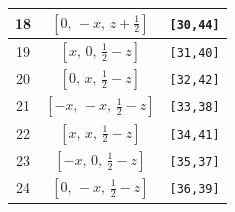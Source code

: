 \documentclass[fleqn,8pt]{jsarticle}
\begin{document}
\begin{longtable}{ccc}
18 & $\left[ 0,\, - x,\, z + \frac{1}{2} \right]$ & {\tt [30,44]} \\ \hline
19 & $\left[ x,\, 0,\, \frac{1}{2} - z \right]$ & {\tt [31,40]} \\ \hline
20 & $\left[ 0,\, x,\, \frac{1}{2} - z \right]$ & {\tt [32,42]} \\ \hline
21 & $\left[ - x,\, - x,\, \frac{1}{2} - z \right]$ & {\tt [33,38]} \\ \hline
22 & $\left[ x,\, x,\, \frac{1}{2} - z \right]$ & {\tt [34,41]} \\ \hline
23 & $\left[ - x,\, 0,\, \frac{1}{2} - z \right]$ & {\tt [35,37]} \\ \hline
24 & $\left[ 0,\, - x,\, \frac{1}{2} - z \right]$ & {\tt [36,39]} \\
\end{longtable}
\renewcommand{\arraystretch}{1.2}
\end{document}

